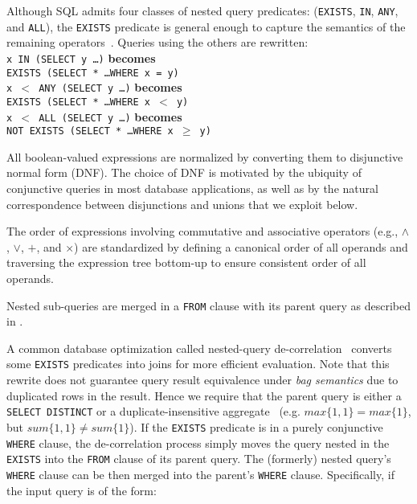 Although SQL admits four classes of nested query predicates: (\texttt{EXISTS}, \texttt{IN}, \texttt{ANY}, and \texttt{ALL}), the \texttt{EXISTS} predicate is general enough to capture the semantics of the remaining operators~\cite{Chandra:2016:PMA:3007263.3007304}.  
Queries using the others are rewritten:\\
\noindent \texttt{x IN (SELECT y \ldots)} \textbf{becomes} \\\hspace*{22.5mm}\texttt{EXISTS (SELECT * \ldots WHERE x = y)}\\
\noindent \texttt{x $<$ ANY (SELECT y \ldots)} \textbf{becomes}  \\\hspace*{22.5mm}\texttt{EXISTS (SELECT * \ldots WHERE x $<$ y)}\\
\noindent \texttt{x $<$ ALL (SELECT y \ldots)} \textbf{becomes}  \\\hspace*{14.5mm}\texttt{NOT EXISTS (SELECT * \ldots WHERE x $\geq$ y)}

All boolean-valued expressions are normalized by converting them to disjunctive normal form (DNF).  
The choice of DNF is motivated by the ubiquity of conjunctive queries in most database applications, as well as by the natural correspondence between disjunctions and unions that we exploit below.

The order of expressions involving commutative and associative operators (e.g., $\wedge$, $\vee$, $+$, and $\times$) are standardized by defining a canonical order of all operands and traversing the expression tree bottom-up to ensure consistent order of all operands.


Nested sub-queries are merged in a \texttt{FROM} clause with its parent query as described in \cite{Chandra:2016:PMA:3007263.3007304}.

A common database optimization called nested-query de-correlation~\cite{492194} converts some \texttt{EXISTS} predicates into joins for more efficient evaluation. 
Note that this rewrite does not guarantee query result equivalence under \textit{bag semantics} due to duplicated rows in the result.
Hence we require that the parent query is either a \texttt{SELECT DISTINCT} or a duplicate-insensitive aggregate~\cite{ilprints101} (e.g. $max\{1,1\}=max\{1\}$, but $sum\{1,1\}\neq sum\{1\}$).
If the \texttt{EXISTS} predicate is in a purely conjunctive \texttt{WHERE} clause, the de-correlation process simply moves the query nested in the \texttt{EXISTS} into the \texttt{FROM} clause of its parent query. 
The (formerly) nested query's \texttt{WHERE} clause can be then merged into the parent's \texttt{WHERE} clause. 
Specifically, if the input query is of the form:

